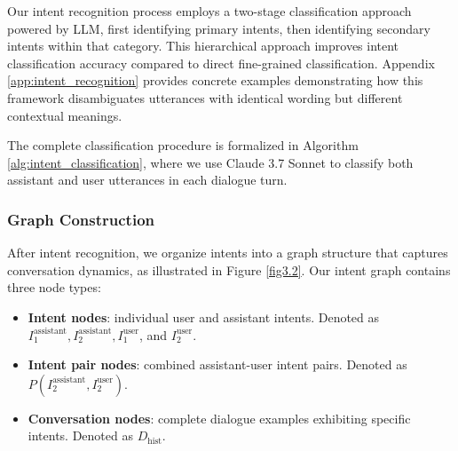 \documentclass[
]{style/ceurart}
\begin{document}
Our intent recognition process employs a two-stage classification approach powered by LLM, first identifying primary intents, then identifying secondary intents within that category. This hierarchical approach improves intent classification accuracy compared to direct fine-grained classification. Appendix \ref{app:intent_recognition} provides concrete examples demonstrating how this framework disambiguates utterances with identical wording but different contextual meanings.

The complete classification procedure is formalized in Algorithm \ref{alg:intent_classification}, where we use Claude 3.7 Sonnet to classify both assistant and user utterances in each dialogue turn.

\subsubsection {Graph Construction} 
After intent recognition, we organize intents into a graph structure that captures conversation dynamics, as illustrated in Figure \ref{fig3.2}.
Our intent graph contains three node types:
\begin{itemize}
    \item \textbf{Intent nodes}: individual user and assistant intents. Denoted as $I_{1}^\text{assistant}, I_{2}^\text{assistant}, I_{1}^\text{user}$, and $I_{2}^\text{user}$.
    \item \textbf{Intent pair nodes}: combined assistant-user intent pairs. Denoted as $P(I_{2}^\text{assistant},I_{2}^\text{user})$.
    \item \textbf{Conversation nodes}: complete dialogue examples exhibiting specific intents. Denoted as $D_\text{hist}$.
\end{itemize}

    
\end{document}
